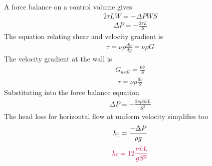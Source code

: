 \documentclass[letterpaper,10pt,english]{sphinxmanual}
\begin{document}
A force balance on a control volume gives
\begin{equation}\label{equation:Rapid_Mix/RM_Derivations:Rapid_Mix/RM_Derivations:50}
\begin{split}2 \tau L W = -\Delta P W S\end{split}
\end{equation}\begin{equation}\label{equation:Rapid_Mix/RM_Derivations:Rapid_Mix/RM_Derivations:51}
\begin{split}\Delta P = -\frac{2 \tau L}{S}\end{split}
\end{equation}
The equation relating shear and velocity gradient is
\begin{equation}\label{equation:Rapid_Mix/RM_Derivations:Rapid_Mix/RM_Derivations:52}
\begin{split}\tau = \nu \rho \frac{du}{dy} = \nu \rho G\end{split}
\end{equation}
The velocity gradient at the wall is
\begin{equation}\label{equation:Rapid_Mix/RM_Derivations:Rapid_Mix/RM_Derivations:53}
\begin{split}G_{wall} = \frac{6 \bar v}{S}\end{split}
\end{equation}\begin{equation}\label{equation:Rapid_Mix/RM_Derivations:Rapid_Mix/RM_Derivations:54}
\begin{split}\tau  = \nu \rho \frac{6 \bar v}{S}\end{split}
\end{equation}
Substituting into the force balance equation
\begin{equation}\label{equation:Rapid_Mix/RM_Derivations:Rapid_Mix/RM_Derivations:55}
\begin{split}\Delta P = -\frac{2 \nu \rho 6 \bar v L}{S^2}\end{split}
\end{equation}
The head loss for horizontal flow at uniform velocity simplifies too
\begin{equation}\label{equation:Rapid_Mix/RM_Derivations:Rapid_Mix/RM_Derivations:56}
\begin{split}h_{{\rm f}} = \frac{-\Delta P}{\rho g}\end{split}
\end{equation}\begin{equation}\label{equation:Rapid_Mix/RM_Derivations:Rapid_Mix/RM_Derivations:57}
\begin{split}\color{purple}{
  h_{{\rm f}} = 12\frac{ \nu \bar v L}{gS^2}
  }\end{split}
\end{equation}
\end{document}
